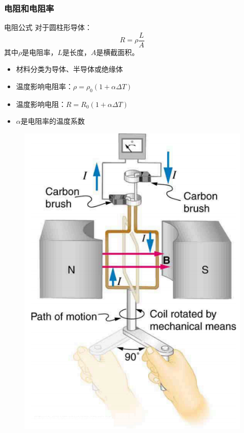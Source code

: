 \documentclass{beamer}
\begin{document}
\begin{frame}
    \frametitle{电阻和电阻率}
    \begin{block}{电阻公式}
        对于圆柱形导体：
        \[ R = \rho\frac{L}{A} \]
        其中$\rho$是电阻率，$L$是长度，$A$是横截面积。
    \end{block}
    \begin{itemize}
        \item 材料分类为导体、半导体或绝缘体
        \item 温度影响电阻率：$\rho = \rho_0(1 + \alpha\Delta T)$
        \item 温度影响电阻：$R = R_0(1 + \alpha\Delta T)$
        \item $\alpha$是电阻率的温度系数
    \end{itemize}
\end{frame}
\begin{frame}{}
    \begin{figure}
        \centering
        \includegraphics[width=1\linewidth]{image.png}
    \end{figure}
\end{frame}
\end{document}
